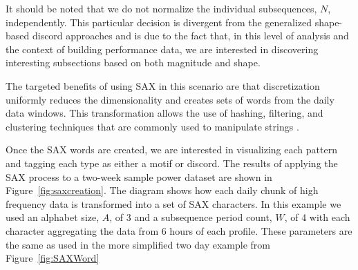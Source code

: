 It should be noted that we do not normalize the individual subsequences, $N$, independently. This particular decision is divergent from the generalized shape-based discord approaches and is due to the fact that, in this level of analysis and the context of building performance data,  we are interested in discovering interesting subsections based on both magnitude and shape. 

The targeted benefits of using SAX in this scenario are that discretization uniformly reduces the dimensionality and creates sets of words from the daily data windows. This transformation allows the use of hashing, filtering, and clustering techniques that are commonly used to manipulate strings \cite{lin_experiencing_2007}. 

Once the SAX words are created, we are interested in visualizing each pattern and tagging each type as either a motif or discord. The results of applying the SAX process to a two-week sample power dataset are shown in Figure~\ref{fig:saxcreation}. The diagram shows how each daily chunk of high frequency data is transformed into a set of SAX characters. In this example we used an alphabet size, $A$, of 3 and a subsequence period count, $W$, of 4 with each character aggregating the data from 6 hours of each profile. These parameters are the same as used in the more simplified two day example from Figure~\ref{fig:SAXWord}
